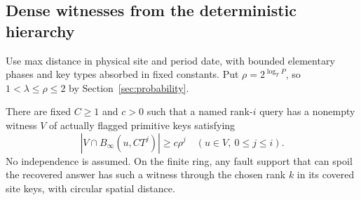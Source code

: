 \subsection{Dense witnesses from the deterministic hierarchy}
Use max distance in physical site and period date, with bounded elementary phases and key types absorbed in fixed constants. Put $\rho=2^{\log_TP}$, so $1<\lambda\le\rho\le2$ by Section~\ref{sec:probability}.
\begin{lemma}\label{lem:dense-witness}
There are fixed $C\ge1$ and $c>0$ such that a named rank-$i$ query has a nonempty witness $V$ of actually flagged primitive keys satisfying
\begin{equation}\label{eq:dense-witness}
 |V\cap B_\infty(u,CT^j)|\ge c\rho^j
 \quad(u\in V,\ 0\le j\le i).
\end{equation}
No independence is assumed. On the finite ring, any fault support that can spoil the recovered answer has such a witness through the chosen rank $k$ in its covered site keys, with circular spatial distance.
\end{lemma}
